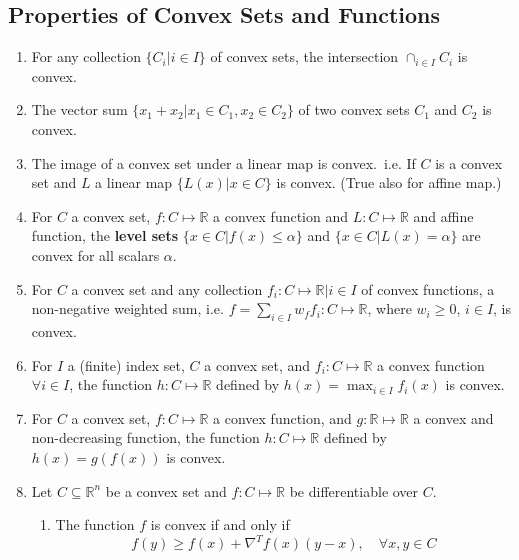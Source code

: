 \documentclass[11pt,a4paper]{article}
\begin{document}
\subsection{Properties of Convex Sets and Functions}
\begin{enumerate}
    \item For any collection $\{ C_i | i \in I \}$ of convex sets, the intersection
        $\cap_{i \in I} C_i$ is convex.

    \item The vector sum $\{ x_1 + x_2 | x_1 \in C_1, x_2 \in C_2 \}$
        of two convex sets $C_1$ and $C_2$ is convex.

    \item The image of a convex set under a linear map is convex.\
        i.e. If $C$ is a convex set and $L$ a linear map $\{ L(x) | x \in C \}$ is convex.
        (True also for affine map.)

    \item For $C$ a convex set,
        $f : C \mapsto \mathbb{R}$ a convex function and $L : C \mapsto \mathbb{R}$
        and affine function, the \textbf{level sets}
        $\{ x \in C | f(x) \leq \alpha \}$
        and
        $\{ x \in C | L(x) = \alpha \}$
        are convex for all scalars $\alpha$.

    \item For $C$ a convex set and any collection $f_i : C \mapsto \mathbb{R} | i \in I$ of convex
        functions, a non-negative weighted sum, i.e.
        $f = \sum_{i \in I} w_f f_i : C \mapsto \mathbb{R}$,
        where $w_i \geq 0$, $i \in I$, is convex.

    \item For $I$ a (finite) index set, $C$ a convex set, and $f_i : C \mapsto \mathbb{R}$
        a convex function $\forall i \in I$, the function $h : C \mapsto \mathbb{R}$ defined by
        $h(x) = \max_{i \in I} f_i(x)$ is convex.

    \item For $C$ a convex set, $f: C \mapsto \mathbb{R}$ a convex function, and
        $g : \mathbb{R} \mapsto \mathbb{R}$
        a convex and non-decreasing function, the function $h : C \mapsto \mathbb{R}$ defined
        by $h(x) = g(f(x))$ is convex.

    \item Let $C \subseteq \mathbb{R}^n$ be a convex set and $f : C \mapsto \mathbb{R}$ be
        differentiable over $C$.
        \begin{enumerate}
            \item The function $f$ is convex if and only if
                \[
                    f(y) \geq f(x) + \nabla^T f(x)(y-x), \quad \forall x, y \in C
                \]


\end{enumerate}
\end{enumerate}
\end{document}
